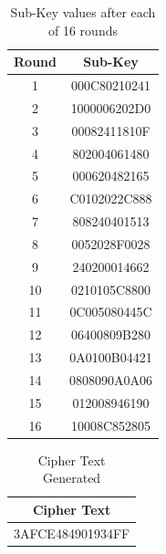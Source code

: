 \documentclass[12pt, letterpaper]{article}
\begin{document}
\begin{table}[h]
    \centering
    \begin{tabular}{|c|c|}
        \hline
        \textbf{Round} & \textbf{Sub-Key} \\
        \hline
        1 & 000C80210241
 \\
        \hline
        2 & 1000006202D0
 \\
        \hline
        3 & 00082411810F
 \\
        \hline
        4 & 802004061480
 \\
        \hline
        5 & 000620482165
 \\
        \hline 
        6 & C0102022C888
 \\
        \hline
        7 & 808240401513
 \\
        \hline
        8 & 0052028F0028
 \\
        \hline
        9 & 240200014662
 \\
        \hline
        10 & 0210105C8800
 \\
        \hline
        11 & 0C005080445C
 \\
        \hline
        12 & 06400809B280 \\
        \hline
        13 & 0A0100B04421 \\
        \hline
        14 & 0808090A0A06
 \\
        \hline
        15 & 012008946190 \\
        \hline
        16 & 10008C852805 \\
        \hline

    \end{tabular}
    \caption{Sub-Key values after each of 16 rounds}
    \label{tab:student-info}
\end{table}



\begin{table}[h]
    \centering
    \begin{tabular}{|c|}
        \hline
          Cipher Text \\
        \hline
           3AFCE484901934FF
  \\
        \hline
    \end{tabular}
    \caption{Cipher Text Generated}
    \label{tab:text-key}
\end{table}

\clearpage
\end{document}
